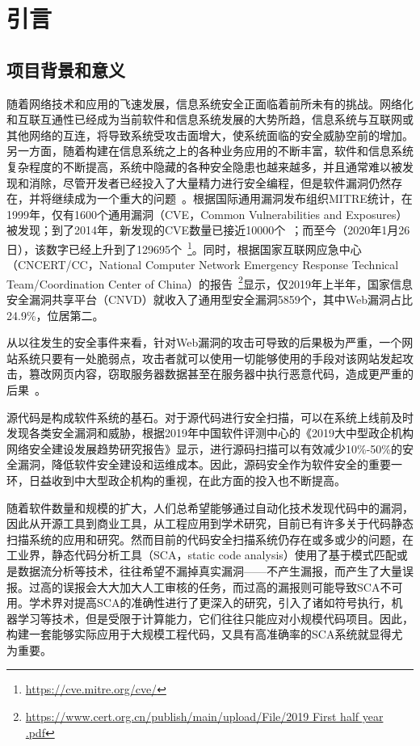 \chapter{引言}

\section{项目背景和意义}
随着网络技术和应用的飞速发展，信息系统安全正面临着前所未有的挑战。网络化和互联互通性已经成为当前软件和信息系统发展的大势所趋，信息系统与互联网或其他网络的互连，将导致系统受攻击面增大，使系统面临的安全威胁空前的增加。另一方面，随着构建在信息系统之上的各种业务应用的不断丰富，软件和信息系统复杂程度的不断提高，系统中隐藏的各种安全隐患也越来越多，并且通常难以被发现和消除，尽管开发者已经投入了大量精力进行安全编程，但是软件漏洞仍然存在，并将继续成为一个重大的问题~\cite{vuldeepecker}。根据国际通用漏洞发布组织MITRE统计，在1999年，仅有1600个通用漏洞（CVE，Common Vulnerabilities and Exposures）被发现；到了2014年，新发现的CVE数量已接近10000个~\cite{刘剑2018软件与网络安全研究综述}；而至今（2020年1月26日），该数字已经上升到了129695个~\footnote{\url{https://cve.mitre.org/cve/}}。同时，根据国家互联网应急中心（CNCERT/CC，National Computer Network Emergency Response Technical Team/Coordination Center of China）的报告~\footnote{\url{https://www.cert.org.cn/publish/main/upload/File/2019 First half year .pdf}}显示，仅2019年上半年，国家信息安全漏洞共享平台（CNVD）就收入了通用型安全漏洞5859个，其中Web漏洞占比24.9\%，位居第二。

从以往发生的安全事件来看，针对Web漏洞的攻击可导致的后果极为严重，一个网站系统只要有一处脆弱点，攻击者就可以使用一切能够使用的手段对该网站发起攻击，篡改网页内容，窃取服务器数据甚至在服务器中执行恶意代码，造成更严重的后果~\cite{WebApplication}。

源代码是构成软件系统的基石。对于源代码进行安全扫描，可以在系统上线前及时发现各类安全漏洞和威胁，根据2019年中国软件评测中心的《2019大中型政企机构网络安全建设发展趋势研究报告》显示，进行源码扫描可以有效减少10\%-50\%的安全漏洞，降低软件安全建设和运维成本。因此，源码安全作为软件安全的重要一环，日益收到中大型政企机构的重视，在此方面的投入也不断提高。

随着软件数量和规模的扩大，人们总希望能够通过自动化技术发现代码中的漏洞，因此从开源工具到商业工具，从工程应用到学术研究，目前已有许多关于代码静态扫描系统的应用和研究。然而目前的代码安全扫描系统仍存在或多或少的问题，在工业界，静态代码分析工具（SCA，static code analysis）使用了基于模式匹配或是数据流分析等技术，往往希望不漏掉真实漏洞——不产生漏报，而产生了大量误报。过高的误报会大大加大人工审核的任务，而过高的漏报则可能导致SCA不可用。学术界对提高SCA的准确性进行了更深入的研究，引入了诸如符号执行，机器学习等技术，但是受限于计算能力，它们往往只能应对小规模代码项目。因此，构建一套能够实际应用于大规模工程代码，又具有高准确率的SCA系统就显得尤为重要。

